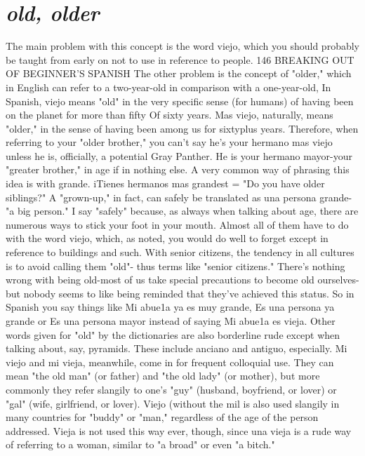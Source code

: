 \section{\emph{old, older}}

The main problem with this concept is the word viejo, which
you should probably be taught from early on not to use in reference
to people.
146 BREAKING OUT OF BEGINNER'S SPANISH
The other problem is the concept of "older," which in English
can refer to a two-year-old in comparison with a one-year-old, In Spanish, viejo means "old" in the very specific sense (for humans) of having
been on the planet for more than fifty Of sixty years. Mas viejo, naturally, means "older," in the sense of having been among us for sixtyplus years. Therefore, when referring to your "older brother," you can't
say he's your hermano mas viejo unless he is, officially, a potential
Gray Panther. He is your hermano mayor-your "greater brother," in
age if in nothing else. A very common way of phrasing this idea is with
grande. iTienes hermanos mas grandest = "Do you have older siblings?" A "grown-up," in fact, can safely be translated as una persona
grande-"a big person."
I say "safely" because, as always when talking about age, there
are numerous ways to stick your foot in your mouth. Almost all of
them have to do with the word viejo, which, as noted, you would do
well to forget except in reference to buildings and such. With senior
citizens, the tendency in all cultures is to avoid calling them "old"-
thus terms like "senior citizens." There's nothing wrong with being
old-most of us take special precautions to become old ourselves-but
nobody seems to like being reminded that they've achieved this status.
So in Spanish you say things like Mi abue1a ya es muy grande, Es
una persona ya grande or Es una persona mayor instead of saying Mi
abue1a es vieja. Other words given for "old" by the dictionaries are
also borderline rude except when talking about, say, pyramids. These
include anciano and antiguo, especially.
Mi viejo and mi vieja, meanwhile, come in for frequent colloquial use. They can mean "the old man" (or father) and "the old lady"
(or mother), but more commonly they refer slangily to one's "guy"
(husband, boyfriend, or lover) or "gal" (wife, girlfriend, or lover). Viejo
(without the mil is also used slangily in many countries for "buddy" or
"man," regardless of the age of the person addressed. Vieja is not used
this way ever, though, since una vieja is a rude way of referring to a
woman, similar to "a broad" or even "a bitch."

